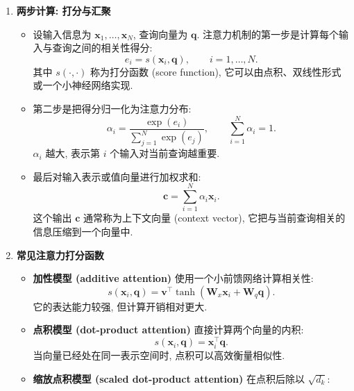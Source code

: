 \documentclass{../nndlcourse}
\begin{document}
\begin{enumerate}
  \item \textbf{两步计算: 打分与汇聚}
    \begin{itemize}
      \item 设输入信息为 $\boldsymbol{x}_1,\ldots,\boldsymbol{x}_N$, 查询向量为 $\boldsymbol{q}$. 注意力机制的第一步是计算每个输入与查询之间的相关性得分:
      \begin{equation*}
        e_i = s(\boldsymbol{x}_i,\boldsymbol{q}), \qquad i=1,\ldots,N.
      \end{equation*}
      其中 $s(\cdot,\cdot)$ 称为打分函数 (score function), 它可以由点积、双线性形式或一个小神经网络实现.
      \item 第二步是把得分归一化为注意力分布:
      \begin{equation*}
        \alpha_i = \frac{\exp(e_i)}{\sum_{j=1}^{N}\exp(e_j)},
        \qquad \sum_{i=1}^{N}\alpha_i = 1.
      \end{equation*}
      $\alpha_i$ 越大, 表示第 $i$ 个输入对当前查询越重要.
      \item 最后对输入表示或值向量进行加权求和:
      \begin{equation*}
        \boldsymbol{c} = \sum_{i=1}^{N}\alpha_i \boldsymbol{x}_i.
      \end{equation*}
      这个输出 $\boldsymbol{c}$ 通常称为上下文向量 (context vector), 它把与当前查询相关的信息压缩到一个向量中.
    \end{itemize}
  \item \textbf{常见注意力打分函数}
    \begin{itemize}
      \item \textbf{加性模型 (additive attention)} 使用一个小前馈网络计算相关性:
      \begin{equation*}
        s(\boldsymbol{x}_i,\boldsymbol{q})
        = \boldsymbol{v}^{\top}\tanh(\boldsymbol{W}_x\boldsymbol{x}_i+\boldsymbol{W}_q\boldsymbol{q}).
      \end{equation*}
      它的表达能力较强, 但计算开销相对更大.
      \item \textbf{点积模型 (dot-product attention)} 直接计算两个向量的内积:
      \begin{equation*}
        s(\boldsymbol{x}_i,\boldsymbol{q}) = \boldsymbol{x}_i^{\top}\boldsymbol{q}.
      \end{equation*}
      当向量已经处在同一表示空间时, 点积可以高效衡量相似性.
      \item \textbf{缩放点积模型 (scaled dot-product attention)} 在点积后除以 $\sqrt{d_k}$:

\end{itemize}
\end{enumerate}
\end{document}
